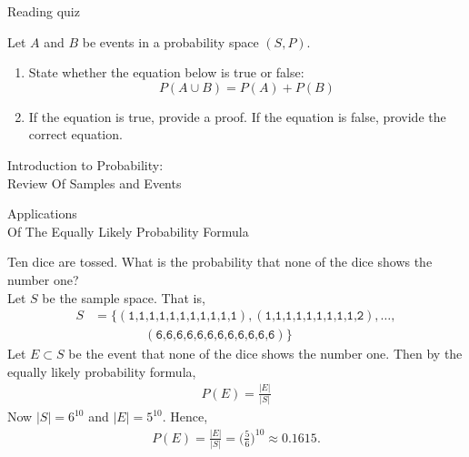 \documentclass[10pt]{beamer}
\begin{document}
\begin{frame}[standout]
Reading quiz
\end{frame}

\begin{frame}

\begin{mygreenbox}[title=\text{Reading Quiz (Events)}]
Let $A$ and $B$ be events in a probability space $(S,P)$.  

\begin{enumerate}
\item State whether the equation below is true or false:
\[ P(A \cup B) = P(A) + P(B) \]	
\item If the equation is true, provide a proof.  If the equation is false, provide the correct equation.
\end{enumerate}

\end{mygreenbox}
	
\end{frame}


\begin{frame}[standout]
Introduction to Probability: \\
Review Of Samples and Events
\end{frame}

\begin{frame}[standout]
Applications \\
Of The Equally Likely Probability Formula
\end{frame}


\begin{frame}
\begin{mygreenbox}[title=\text{Example: Ten Dice}]
Ten dice are tossed.  What is the probability that none of the dice shows the number one? \\

\pause 
Let $S$ be the sample space.  That is,
\begin{align*}
 S&=\bigg\{(\texttt{1,1,1,1,1,1,1,1,1,1,1}), (\texttt{1,1,1,1,1,1,1,1,1,2}), \hdots,  \\
 & \qquad \qquad (\texttt{6,6,6,6,6,6,6,6,6,6,6,6})\bigg\}	
\end{align*}
%
Let $E \subset S$ be the event that none of the dice shows the number one. Then by the equally likely probability formula, 
\begin{align*}
P(E) = 	\frac{|E|}{|S|} 
\end{align*}
\pause 
Now $|S|=6^{10}$ and $|E|=5^{10}$.  
\pause 
Hence,
%
\begin{align*}
P(E) = 	\frac{|E|}{|S|} = \bigg(\frac{5}{6}\bigg)^{10} \approx 0.1615.
\end{align*}
\end{mygreenbox}

\end{frame}
\end{document}

